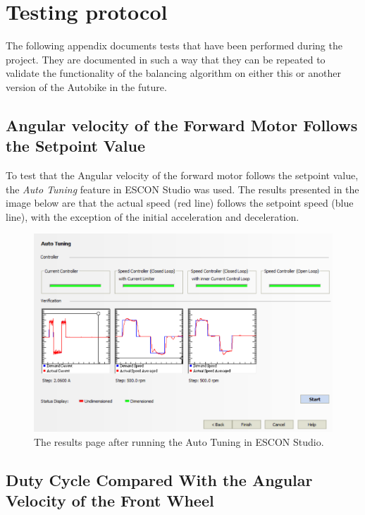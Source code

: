 \chapter{Testing protocol} \label{testingProtocol}

The following appendix documents tests that have been performed during the project. They are documented in such a way that they can be repeated to validate the functionality of the balancing algorithm on either this or another version of the Autobike in the future.

\section{Angular velocity of the Forward Motor Follows the Setpoint Value}

To test that the Angular velocity of the forward motor follows the setpoint value, the \textit{Auto Tuning} feature in ESCON Studio was used. The results presented in the image below are that the actual speed (red line) follows the setpoint speed (blue line), with the exception of the initial acceleration and deceleration. 

\begin{figure}[h]
    \centering
    \includegraphics[width=\textwidth-2cm]{figure/esconAutoTuning.png}
    \caption{The results page after running the Auto Tuning in ESCON Studio.}
\end{figure}

\section{Duty Cycle Compared With the Angular Velocity of the Front Wheel}

